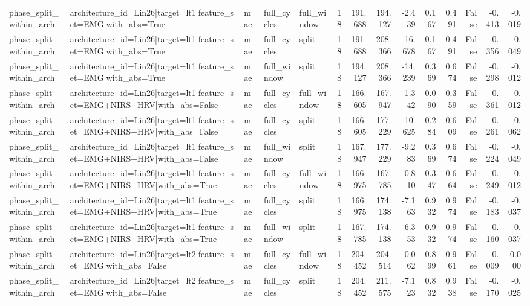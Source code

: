 \begin{table}
\begin{tabular}{lllllrrrrrrrrr}
phase_split_within_arch & architecture_id=Lin26|target=lt1|feature_set=EMG|with_abs=True & mae & full_cycles & full_window & 18 & 191.688 & 194.127 & -2.439 & 0.167 & 0.491 & False & -0.413 & -0.019 \\
phase_split_within_arch & architecture_id=Lin26|target=lt1|feature_set=EMG|with_abs=True & mae & full_cycles & split & 18 & 191.688 & 208.366 & -16.678 & 0.167 & 0.491 & False & -0.356 & -0.049 \\
phase_split_within_arch & architecture_id=Lin26|target=lt1|feature_set=EMG|with_abs=True & mae & full_window & split & 18 & 194.127 & 208.366 & -14.239 & 0.369 & 0.674 & False & -0.298 & -0.012 \\
phase_split_within_arch & architecture_id=Lin26|target=lt1|feature_set=EMG+NIRS+HRV|with_abs=False & mae & full_cycles & full_window & 18 & 166.605 & 167.947 & -1.342 & 0.090 & 0.359 & False & -0.361 & -0.012 \\
phase_split_within_arch & architecture_id=Lin26|target=lt1|feature_set=EMG+NIRS+HRV|with_abs=False & mae & full_cycles & split & 18 & 166.605 & 177.229 & -10.625 & 0.284 & 0.609 & False & -0.261 & -0.062 \\
phase_split_within_arch & architecture_id=Lin26|target=lt1|feature_set=EMG+NIRS+HRV|with_abs=False & mae & full_window & split & 18 & 167.947 & 177.229 & -9.283 & 0.369 & 0.674 & False & -0.224 & -0.049 \\
phase_split_within_arch & architecture_id=Lin26|target=lt1|feature_set=EMG+NIRS+HRV|with_abs=True & mae & full_cycles & full_window & 18 & 166.975 & 167.785 & -0.810 & 0.347 & 0.664 & False & -0.249 & -0.012 \\
phase_split_within_arch & architecture_id=Lin26|target=lt1|feature_set=EMG+NIRS+HRV|with_abs=True & mae & full_cycles & split & 18 & 166.975 & 174.138 & -7.163 & 0.932 & 0.974 & False & -0.183 & -0.037 \\
phase_split_within_arch & architecture_id=Lin26|target=lt1|feature_set=EMG+NIRS+HRV|with_abs=True & mae & full_window & split & 18 & 167.785 & 174.138 & -6.353 & 0.932 & 0.974 & False & -0.160 & -0.037 \\
phase_split_within_arch & architecture_id=Lin26|target=lt2|feature_set=EMG|with_abs=False & mae & full_cycles & full_window & 18 & 204.452 & 204.514 & -0.062 & 0.899 & 0.961 & False & -0.009 & 0.000 \\
phase_split_within_arch & architecture_id=Lin26|target=lt2|feature_set=EMG|with_abs=False & mae & full_cycles & split & 18 & 204.452 & 211.575 & -7.123 & 0.832 & 0.938 & False & -0.170 & -0.025 \\

\end{tabular}
\end{table}
